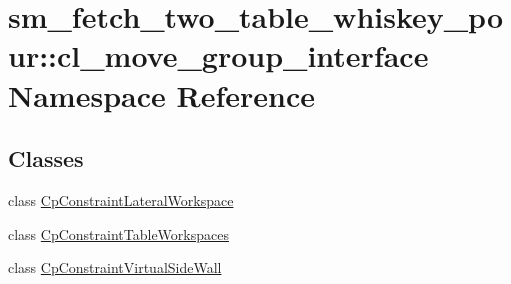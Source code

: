 \hypertarget{namespacesm__fetch__two__table__whiskey__pour_1_1cl__move__group__interface}{}\section{sm\+\_\+fetch\+\_\+two\+\_\+table\+\_\+whiskey\+\_\+pour\+:\+:cl\+\_\+move\+\_\+group\+\_\+interface Namespace Reference}
\label{namespacesm__fetch__two__table__whiskey__pour_1_1cl__move__group__interface}
\subsection*{Classes}
\begin{DoxyCompactItemize}
\item 
class \hyperlink{classsm__fetch__two__table__whiskey__pour_1_1cl__move__group__interface_1_1CpConstraintLateralWorkspace}{Cp\+Constraint\+Lateral\+Workspace}
\item 
class \hyperlink{classsm__fetch__two__table__whiskey__pour_1_1cl__move__group__interface_1_1CpConstraintTableWorkspaces}{Cp\+Constraint\+Table\+Workspaces}
\item 
class \hyperlink{classsm__fetch__two__table__whiskey__pour_1_1cl__move__group__interface_1_1CpConstraintVirtualSideWall}{Cp\+Constraint\+Virtual\+Side\+Wall}
\end{DoxyCompactItemize}
